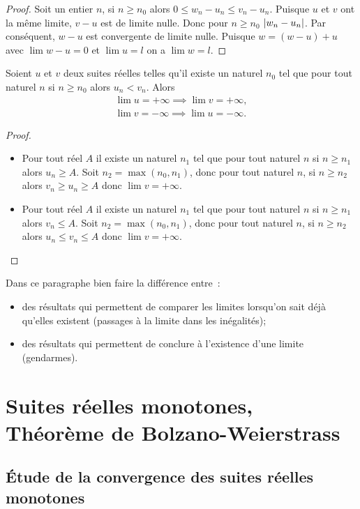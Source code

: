 \begin{proof}
  Soit un entier $n$, si $n \geq n_0$ alors $0 \leq w_n-u_n \leq v_n -u_n$. Puisque $u$ et $v$ ont la même limite, $v-u$ est de limite nulle. Donc pour $n \geq n_0$ $\left\lvert w_n-u_n\right\rvert$. Par conséquent, $w-u$ est convergente de limite nulle. Puisque $w=(w-u)+u$ avec $\lim w-u=0$ et $\lim u=l$ on a $\lim w =l$.
\end{proof}
\begin{prop}
  Soient $u$ et $v$ deux suites réelles telles qu'il existe un naturel $n_0$ tel que pour tout naturel $n$ si $n \geq n_0$ alors $u_n<v_n$. Alors
  \begin{gather}
    \lim u =+\infty \implies \lim v =+\infty,\\
    \lim v =-\infty \implies \lim u =-\infty.
  \end{gather}
\end{prop}
\begin{proof}
  \begin{itemize}
  \item Pour tout réel $A$ il existe un naturel $n_1$ tel que pour tout naturel $n$ si $n \geq n_1$ alors $u_n \geq A$. Soit $n_2=\max(n_0,n_1)$, donc pour tout naturel $n$, si $n \geq n_2$ alors $v_n \geq u_n \geq A$ donc $\lim v=+\infty$.
  \item Pour tout réel $A$ il existe un naturel $n_1$ tel que pour tout naturel $n$ si $n \geq n_1$ alors $v_n \leq A$. Soit $n_2=\max(n_0,n_1)$, donc pour tout naturel $n$, si $n \geq n_2$ alors $u_n \leq v_n \leq A$ donc $\lim v=+\infty$.
  \end{itemize}
\end{proof}
Dans ce paragraphe bien faire la différence entre~:
\begin{itemize}
\item des résultats qui permettent de comparer les limites lorsqu'on sait déjà qu'elles existent (passages à la limite dans les inégalités);
\item des résultats qui permettent de conclure à l'existence d'une limite (gendarmes).
\end{itemize}

\section{Suites réelles monotones, Théorème de Bolzano-Weierstrass}

\subsection{Étude de la convergence des suites réelles monotones}

